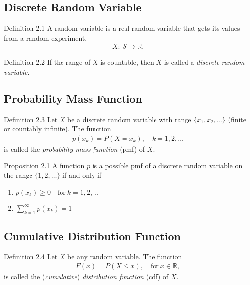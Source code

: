 \subsection{Discrete Random Variable}
\begin{boks}{Definition 2.1}
A random variable is a real random variable that gets its values from a random experiment.
\begin{align*}
    X: \ S \rightarrow \mathbb{R}.
\end{align*}
\end{boks}
\begin{boks}{Definition 2.2}
If the range of $X$ is countable, then $X$ is called a \textit{discrete random variable}.
\end{boks}

\subsection{Probability Mass Function}
\begin{boks}{Definition 2.3}
Let $X$ be a discrete random variable with range $\{x_1, x_2, \ldots\}$ (finite or countably infinite). The function
\begin{align*}
    p(x_k) = P(X = x_k), \quad k = 1,2,\ldots
\end{align*}
is called the \textit{probability mass function} (pmf) of $X$.
\end{boks}

\begin{minipage}{0.7\textwidth}
  \begin{boks}{Proposition 2.1}
  A function $p$ is a possible pmf of a discrete random variable on the range $\{1,2,\ldots\}$ if and only if
  \vspace{5mm}
  \begin{enumerate}
      \item $p(x_k)\geq 0 \quad \text{for} \ k = 1,2,\ldots$
      \item $\sum_{k=1}^\infty p(x_k) = 1$
  \end{enumerate}
  \end{boks}
\end{minipage}

\subsection{Cumulative Distribution Function}
\begin{minipage}{0.7\textwidth}
  \begin{boks}{Definition 2.4}
  Let $X$ be any random variable. The function
  \begin{align*}
      F(x) = P(X\leq x), \quad \text{for} \ x\in \mathbb{R},
  \end{align*}
  is called the (\textit{cumulative}) \textit{distribution function} (cdf) of $X$.
  \end{boks}
\end{minipage}

